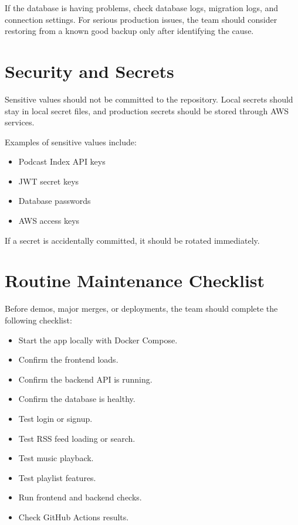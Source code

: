 \documentclass{article}
\begin{document}
If the database is having problems, check database logs, migration logs, and connection settings. For serious production issues, the team should consider restoring from a known good backup only after identifying the cause.

\section{Security and Secrets}
Sensitive values should not be committed to the repository. Local secrets should stay in local secret files, and production secrets should be stored through AWS services.

Examples of sensitive values include:

\begin{itemize}
    \item Podcast Index API keys
    \item JWT secret keys
    \item Database passwords
    \item AWS access keys
\end{itemize}

If a secret is accidentally committed, it should be rotated immediately.

\section{Routine Maintenance Checklist}
Before demos, major merges, or deployments, the team should complete the following checklist:

\begin{itemize}
    \item Start the app locally with Docker Compose.
    \item Confirm the frontend loads.
    \item Confirm the backend API is running.
    \item Confirm the database is healthy.
    \item Test login or signup.
    \item Test RSS feed loading or search.
    \item Test music playback.
    \item Test playlist features.
    \item Run frontend and backend checks.
    \item Check GitHub Actions results.
\end{itemize}
\end{document}
